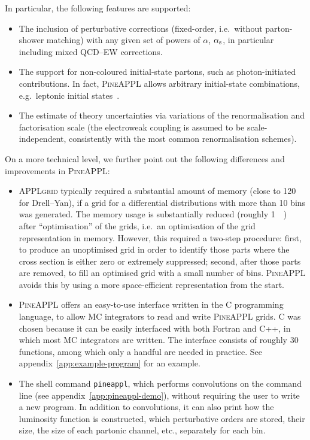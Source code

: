 In particular, the following features are supported:
\begin{itemize}
\item The inclusion of perturbative corrections (fixed-order, i.e.\ without parton-shower matching) with any given set of powers of $\alpha$, $\alpha_\mathrm{s}$, in particular including mixed QCD--EW corrections.
\item The support for non-coloured initial-state partons, such as photon-initiated contributions.
In fact, \textsc{PineAPPL} allows arbitrary initial-state combinations, e.g.\ leptonic initial states~\cite{Bertone:2015lqa,Buonocore:2020nai}.
\item The estimate of theory uncertainties via variations of the renormalisation and factorisation scale (the electroweak coupling is assumed to be scale-independent, consistently with the most common renormalisation schemes).
\end{itemize}
On a more technical level, we further point out the following differences and improvements in \textsc{PineAPPL}:
\begin{itemize}
\item \textsc{APPLgrid} typically required a substantial amount of memory (close to \SI{120}{\giga\byte} for Drell--Yan), if a grid for a differential distributions with more than 10 bins was generated.
The memory usage is substantially reduced (roughly \SI{1}{\giga\byte}) after \enquote{optimisation} of the grids, i.e.\ an optimisation of the grid representation in memory.
However, this required a two-step procedure: first, to produce an unoptimised grid in order to identify those parts where the cross section is either zero or extremely suppressed; second, after those parts are removed, to fill an optimised grid with a small number of bins.
\textsc{PineAPPL} avoids this by using a more space-efficient representation from the start.
\item \textsc{PineAPPL} offers an easy-to-use interface written in the C programming language, to allow MC integrators to read and write \textsc{PineAPPL} grids.
C was chosen because it can be easily interfaced with both Fortran and C++, in which most MC integrators are written.
The interface consists of roughly 30 functions, among which only a handful are needed in practice.
See appendix~\ref{app:example-program} for an example.
\item The shell command \texttt{pineappl}, which performs convolutions on the command line (see appendix~\ref{app:pineappl-demo}), without requiring the user to write a new program.
In addition to convolutions, it can also print how the luminosity function is constructed, which perturbative orders are stored, their size, the size of each partonic channel, etc., separately for each bin.
\end{itemize}

